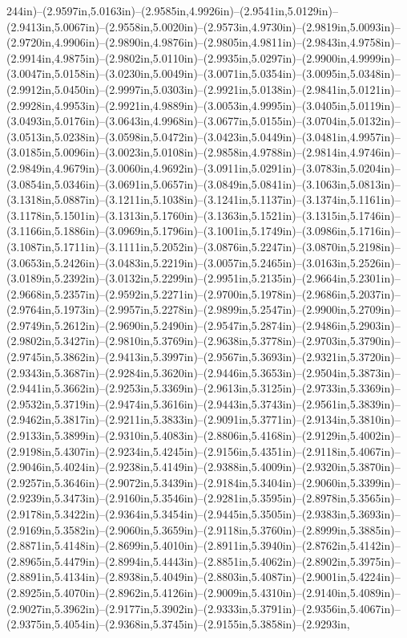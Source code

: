 244in)--(2.9597in,5.0163in)--(2.9585in,4.9926in)--(2.9541in,5.0129in)--(2.9413in,5.0067in)--(2.9558in,5.0020in)--(2.9573in,4.9730in)--(2.9819in,5.0093in)--(2.9720in,4.9906in)--(2.9890in,4.9876in)--(2.9805in,4.9811in)--(2.9843in,4.9758in)--(2.9914in,4.9875in)--(2.9802in,5.0110in)--(2.9935in,5.0297in)--(2.9900in,4.9999in)--(3.0047in,5.0158in)--(3.0230in,5.0049in)--(3.0071in,5.0354in)--(3.0095in,5.0348in)--(2.9912in,5.0450in)--(2.9997in,5.0303in)--(2.9921in,5.0138in)--(2.9841in,5.0121in)--(2.9928in,4.9953in)--(2.9921in,4.9889in)--(3.0053in,4.9995in)--(3.0405in,5.0119in)--(3.0493in,5.0176in)--(3.0643in,4.9968in)--(3.0677in,5.0155in)--(3.0704in,5.0132in)--(3.0513in,5.0238in)--(3.0598in,5.0472in)--(3.0423in,5.0449in)--(3.0481in,4.9957in)--(3.0185in,5.0096in)--(3.0023in,5.0108in)--(2.9858in,4.9788in)--(2.9814in,4.9746in)--(2.9849in,4.9679in)--(3.0060in,4.9692in)--(3.0911in,5.0291in)--(3.0783in,5.0204in)--(3.0854in,5.0346in)--(3.0691in,5.0657in)--(3.0849in,5.0841in)--(3.1063in,5.0813in)--(3.1318in,5.0887in)--(3.1211in,5.1038in)--(3.1241in,5.1137in)--(3.1374in,5.1161in)--(3.1178in,5.1501in)--(3.1313in,5.1760in)--(3.1363in,5.1521in)--(3.1315in,5.1746in)--(3.1166in,5.1886in)--(3.0969in,5.1796in)--(3.1001in,5.1749in)--(3.0986in,5.1716in)--(3.1087in,5.1711in)--(3.1111in,5.2052in)--(3.0876in,5.2247in)--(3.0870in,5.2198in)--(3.0653in,5.2426in)--(3.0483in,5.2219in)--(3.0057in,5.2465in)--(3.0163in,5.2526in)--(3.0189in,5.2392in)--(3.0132in,5.2299in)--(2.9951in,5.2135in)--(2.9664in,5.2301in)--(2.9668in,5.2357in)--(2.9592in,5.2271in)--(2.9700in,5.1978in)--(2.9686in,5.2037in)--(2.9764in,5.1973in)--(2.9957in,5.2278in)--(2.9899in,5.2547in)--(2.9900in,5.2709in)--(2.9749in,5.2612in)--(2.9690in,5.2490in)--(2.9547in,5.2874in)--(2.9486in,5.2903in)--(2.9802in,5.3427in)--(2.9810in,5.3769in)--(2.9638in,5.3778in)--(2.9703in,5.3790in)--(2.9745in,5.3862in)--(2.9413in,5.3997in)--(2.9567in,5.3693in)--(2.9321in,5.3720in)--(2.9343in,5.3687in)--(2.9284in,5.3620in)--(2.9446in,5.3653in)--(2.9504in,5.3873in)--(2.9441in,5.3662in)--(2.9253in,5.3369in)--(2.9613in,5.3125in)--(2.9733in,5.3369in)--(2.9532in,5.3719in)--(2.9474in,5.3616in)--(2.9443in,5.3743in)--(2.9561in,5.3839in)--(2.9462in,5.3817in)--(2.9211in,5.3833in)--(2.9091in,5.3771in)--(2.9134in,5.3810in)--(2.9133in,5.3899in)--(2.9310in,5.4083in)--(2.8806in,5.4168in)--(2.9129in,5.4002in)--(2.9198in,5.4307in)--(2.9234in,5.4245in)--(2.9156in,5.4351in)--(2.9118in,5.4067in)--(2.9046in,5.4024in)--(2.9238in,5.4149in)--(2.9388in,5.4009in)--(2.9320in,5.3870in)--(2.9257in,5.3646in)--(2.9072in,5.3439in)--(2.9184in,5.3404in)--(2.9060in,5.3399in)--(2.9239in,5.3473in)--(2.9160in,5.3546in)--(2.9281in,5.3595in)--(2.8978in,5.3565in)--(2.9178in,5.3422in)--(2.9364in,5.3454in)--(2.9445in,5.3505in)--(2.9383in,5.3693in)--(2.9169in,5.3582in)--(2.9060in,5.3659in)--(2.9118in,5.3760in)--(2.8999in,5.3885in)--(2.8871in,5.4148in)--(2.8699in,5.4010in)--(2.8911in,5.3940in)--(2.8762in,5.4142in)--(2.8965in,5.4479in)--(2.8994in,5.4443in)--(2.8851in,5.4062in)--(2.8902in,5.3975in)--(2.8891in,5.4134in)--(2.8938in,5.4049in)--(2.8803in,5.4087in)--(2.9001in,5.4224in)--(2.8925in,5.4070in)--(2.8962in,5.4126in)--(2.9009in,5.4310in)--(2.9140in,5.4089in)--(2.9027in,5.3962in)--(2.9177in,5.3902in)--(2.9333in,5.3791in)--(2.9356in,5.4067in)--(2.9375in,5.4054in)--(2.9368in,5.3745in)--(2.9155in,5.3858in)--(2.9293in,